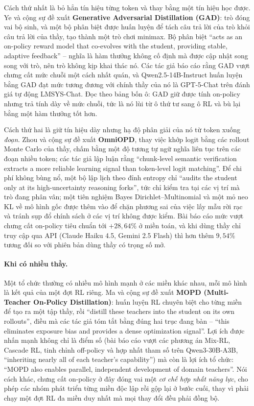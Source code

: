 Cách thứ nhất là bỏ hẳn tín hiệu từng token và thay bằng một tín hiệu học được. Ye và cộng sự \cite{ye2025gad} đề xuất \textbf{Generative Adversarial Distillation (GAD)}: trò đóng vai bộ sinh, và một bộ phân biệt được huấn luyện để tách câu trả lời của trò khỏi câu trả lời của thầy, tạo thành một trò chơi minimax. Bộ phân biệt ``acts as an on-policy reward model that co-evolves with the student, providing stable, adaptive feedback'' -- nghĩa là hàm thưởng không cố định mà được cập nhật song song với trò, nên trò không kịp khai thác nó. Các tác giả báo cáo rằng GAD vượt chưng cất mức chuỗi một cách nhất quán, và Qwen2.5-14B-Instruct huấn luyện bằng GAD đạt mức tương đương với chính thầy của nó là GPT-5-Chat trên đánh giá tự động LMSYS-Chat. Đọc theo bảng bốn ô: GAD giữ được tính on-policy nhưng trả tính dày về mức chuỗi, tức là nó lùi từ ô thứ tư sang ô RL và bù lại bằng một hàm thưởng tốt hơn.

Cách thứ hai là giữ tín hiệu dày nhưng hạ độ phân giải của nó từ token xuống \emph{đoạn}. Zhou và cộng sự \cite{zhou2026omniopd} đề xuất \textbf{OmniOPD}, thay việc khớp logit bằng các rollout Monte Carlo của thầy, chấm bằng một độ tương tự ngữ nghĩa liên tục trên các đoạn nhiều token; các tác giả lập luận rằng ``chunk-level semantic verification extracts a more reliable learning signal than token-level logit matching''. Để chi phí không bùng nổ, một bộ lập lịch theo đỉnh entropy chỉ ``audits the student only at its high-uncertainty reasoning forks'', tức chỉ kiểm tra tại các vị trí mà trò đang phân vân; một tiên nghiệm Bayes Dirichlet--Multinomial và một mỏ neo KL về mô hình gốc được thêm vào để chặn phương sai của việc lấy mẫu rời rạc và tránh sụp đổ chính sách ở các vị trí không được kiểm. Bài báo cáo mức vượt chưng cất on-policy tiêu chuẩn tới $+28{,}64\%$ ở miền toán, và khi dùng thầy chỉ truy cập qua API (Claude Haiku 4.5, Gemini 2.5 Flash) thì hơn thêm $9{,}54\%$ tương đối so với phiên bản dùng thầy có trọng số mở.

\paragraph{Khi có nhiều thầy.} Một tổ chức thường có nhiều mô hình mạnh ở các miền khác nhau, mỗi mô hình là kết quả của một đợt RL riêng. Ma và cộng sự \cite{ma2026mopd} đề xuất \textbf{MOPD (Multi-Teacher On-Policy Distillation)}: huấn luyện RL chuyên biệt cho từng miền để tạo ra một tập thầy, rồi ``distill these teachers into the student on its own rollouts'', điều mà các tác giả tóm tắt bằng đúng hai trục đang bàn -- ``this eliminates exposure bias and provides a dense optimization signal''. Lợi ích được nhấn mạnh không chỉ là điểm số (bài báo cáo vượt các phương án Mix-RL, Cascade RL, tinh chỉnh off-policy và hợp nhất tham số trên Qwen3-30B-A3B, ``inheriting nearly all of each teacher's capability'') mà còn là lợi ích tổ chức: ``MOPD also enables parallel, independent development of domain teachers''. Nói cách khác, chưng cất on-policy ở đây đóng vai một \emph{cơ chế hợp nhất năng lực}, cho phép các nhóm phát triển từng miền độc lập rồi gộp lại ở bước cuối, thay vì phải chạy một đợt RL đa miền duy nhất mà mọi thay đổi đều phải đồng bộ.

